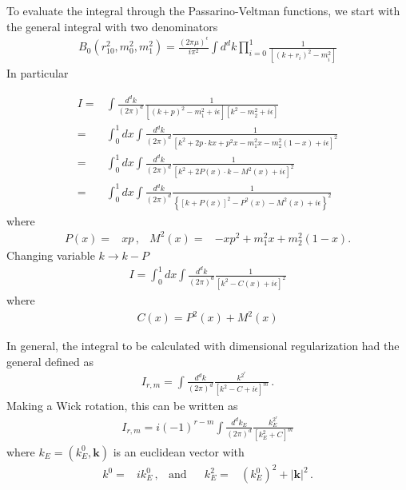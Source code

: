 To evaluate the integral through the Passarino-Veltman functions, we start with the general integral with two denominators
\begin{align}
  \label{eq:pvbo}
  B_{0}\left(r_{10}^{2}, m_{0}^{2}, m_{1}^{2}\right)=\frac{(2 \pi \mu)^{\epsilon}}{i \pi^{2}} \int d^{d} k \prod_{i=0}^{1} \frac{1}{\left[\left(k+r_{i}\right)^{2}-m_{i}^{2}\right]}
\end{align}
In particular

\begin{align}
  I =&\int \frac{d^{d} k}{(2 \pi)^{d}} \frac{1}{\left[(k+p)^{2}-m_{1}^{2}+i \epsilon\right]\left[k^{2}-m_{2}^{2}+i \epsilon\right]} \nonumber\\
    =&\int_{0}^{1} d x \int \frac{d^{d} k}{(2 \pi)^{d}} \frac{1}{\left[k^{2}+2 p \cdot k x+p^{2} x-m_{1}^{2} x-m_{2}^{2}(1-x)+i \epsilon\right]^{2}} \nonumber\\
  =&\int_{0}^{1} d x \int \frac{d^{d} k}{(2 \pi)^{d}} \frac{1}{\left[k^{2}+2 P(x) \cdot k-M^{2}(x)+i \epsilon\right]^{2}} \nonumber\\
  =&\int_{0}^{1} d x \int \frac{d^{d} k}{(2 \pi)^{d}} \frac{1}{\left\{[k+P(x)]^{2}-P^{2}(x)-M^{2}(x)+i \epsilon\right\}^{2}}
\end{align}
where
\begin{align}
  P(x)=&x p\,,& M^{2}(x)=&-x p^{2}+m_{1}^{2} x+m_{2}^{2}(1-x).
\end{align}
Changing variable $k\to k-P$
\begin{align}
  I=\int_{0}^{1} d x \int \frac{d^{d} k}{(2 \pi)^{d}} \frac{1}{\left[k^{2}-C(x)+i \epsilon\right]^{2}}
\end{align}
where
\begin{align}
  \label{eq:cx}
  C(x)=P^{2}(x)+M^{2}(x)
\end{align}


In general, the integral to be calculated with dimensional regularization had the general
defined as
\begin{align}
  I_{r, m}=\int \frac{d^{d} k}{(2 \pi)^{d}} \frac{k^{2^{r}}}{\left[k^{2}-C+i \epsilon\right]^{m}}\,.
\end{align}
Making a Wick rotation, this can be written as
\begin{align}
  I_{r, m}=i(-1)^{r-m} \int \frac{d^{d} k_{E}}{(2 \pi)^{d}} \frac{k_{E}^{2^{r}}}{\left[k_{E}^{2}+C\right]^{m}}
\end{align}
where $k_{E}=\left(k_{E}^{0}, \boldsymbol{k}\right)$ is an euclidean vector with
\begin{align}
  k^{0}=&i k_{E}^{0}\,,& \text{and} && k_{E}^{2}=&\left(k_{E}^{0}\right)^{2}+|\boldsymbol{k}|^{2}\,.
\end{align}


